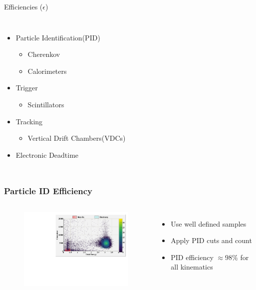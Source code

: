 \documentclass[12pt]{beamer}
\begin{document}
\begin{frame}
\begin{block}{Efficiencies ($\epsilon$)}
	\begin{columns}

		\begin{itemize}
		\item Particle Identification(PID) 
		\begin{itemize}
			\item Cherenkov
			\item Calorimeters
		\end{itemize}
		\item Trigger
		\begin{itemize}
			\item Scintillators
		\end{itemize}
		\item Tracking
		\begin{itemize}
			\item Vertical Drift Chambers(VDCs)
		\end{itemize}
		\item Electronic Deadtime
	\end{itemize}	
	\end{columns}
\end{block}
\end{frame}

\begin{frame}{}
\frametitle{Particle ID Efficiency}
\begin{columns}
		\column{0.65\textwidth}
	\begin{figure}[t]%
		\includegraphics[width=8cm]{../images/Thesis/PID_2d}
	\end{figure}
	\column{0.35\textwidth}
	\begin{itemize}
		\item Use well defined samples
		\item Apply PID cuts and count
		\item PID efficiency $\approx 98\%$  for all kinematics 
	\end{itemize}

\end{columns}	
\end{frame}
\end{document}
